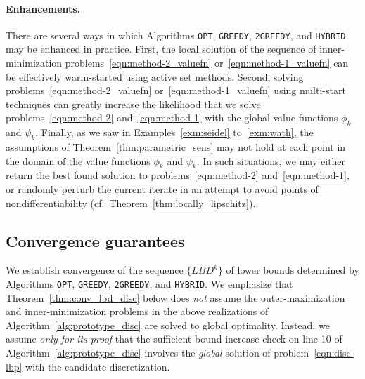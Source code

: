 \documentclass{article}
\newcommand{\1}[1]{\mathds{1}\left[#1\right]}
\begin{document}
\paragraph*{Enhancements.} There are several ways in which Algorithms \texttt{OPT}, \texttt{GREEDY},  \texttt{2GREEDY}, and \texttt{HYBRID} may be enhanced in practice.
First, the local solution of the sequence of inner-minimization problems~\eqref{eqn:method-2_valuefn} or~\eqref{eqn:method-1_valuefn} can be effectively warm-started using active set methods.
Second, solving problems~\eqref{eqn:method-2_valuefn} or~\eqref{eqn:method-1_valuefn} using multi-start techniques can greatly increase the likelihood that we solve problems~\eqref{eqn:method-2} and~\eqref{eqn:method-1} with the global value functions $\phi_k$ and $\psi_k$.
Finally, as we saw in Examples~\ref{exm:seidel} to~\ref{exm:wath}, the assumptions of Theorem~\ref{thm:parametric_sens} may not hold at each point in the domain of the value functions $\phi_k$ and $\psi_k$.
In such situations, we may either return the best found solution to problems~\eqref{eqn:method-2} and~\eqref{eqn:method-1}, or randomly perturb the current iterate in an attempt to avoid points of nondifferentiability (cf.\ Theorem~\ref{thm:locally_lipschitz}).


 


\subsection{Convergence guarantees}
\label{subsec:convergence_guarantees}

We establish convergence of the sequence $\{LBD^k\}$ of lower bounds determined by Algorithms \texttt{OPT}, \texttt{GREEDY}, \texttt{2GREEDY}, and \texttt{HYBRID}.
We emphasize that Theorem~\ref{thm:conv_lbd_disc} below does \textit{not} assume the outer-maximization and inner-minimization problems in the above realizations of Algorithm~\ref{alg:prototype_disc} are solved to global optimality.
Instead, we assume \textit{only for its proof} that the sufficient bound increase check on line 10 of Algorithm~\ref{alg:prototype_disc} involves the \textit{global} solution of problem~\eqref{eqn:disc-lbp} with the candidate discretization.
\end{document}
